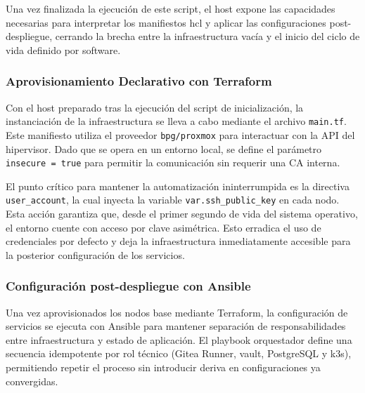 \documentclass[runningheads]{llncs}
\begin{document}
Una vez finalizada la ejecución de este script, el host expone las capacidades necesarias para interpretar los manifiestos \gls{hcl} y aplicar las configuraciones post-despliegue, cerrando la brecha entre la infraestructura vacía y el inicio del ciclo de vida definido por software.



\subsubsection{Aprovisionamiento Declarativo con Terraform}

Con el host preparado tras la ejecución del script de inicialización, la instanciación de la infraestructura se lleva a cabo mediante el archivo \texttt{main.tf}. Este manifiesto utiliza el proveedor \texttt{bpg/proxmox} para interactuar con la API del hipervisor. Dado que se opera en un entorno local, se define el parámetro \texttt{insecure = true} para permitir la comunicación sin requerir una CA interna.

El punto crítico para mantener la automatización ininterrumpida es la directiva \texttt{user\_account}, la cual inyecta la variable \texttt{var.ssh\_public\_key} en cada nodo. Esta acción garantiza que, desde el primer segundo de vida del sistema operativo, el entorno cuente con acceso por clave asimétrica. Esto erradica el uso de credenciales por defecto y deja la infraestructura inmediatamente accesible para la posterior configuración de los servicios.



\subsubsection{Configuración post-despliegue con Ansible}
Una vez aprovisionados los nodos base mediante Terraform, la configuración de servicios se ejecuta con Ansible para mantener separación de responsabilidades entre infraestructura y estado de aplicación. El playbook orquestador define una secuencia idempotente por rol técnico (Gitea Runner, \gls{vault}, PostgreSQL y \gls{k3s}), permitiendo repetir el proceso sin introducir deriva en configuraciones ya convergidas.


\end{document}
